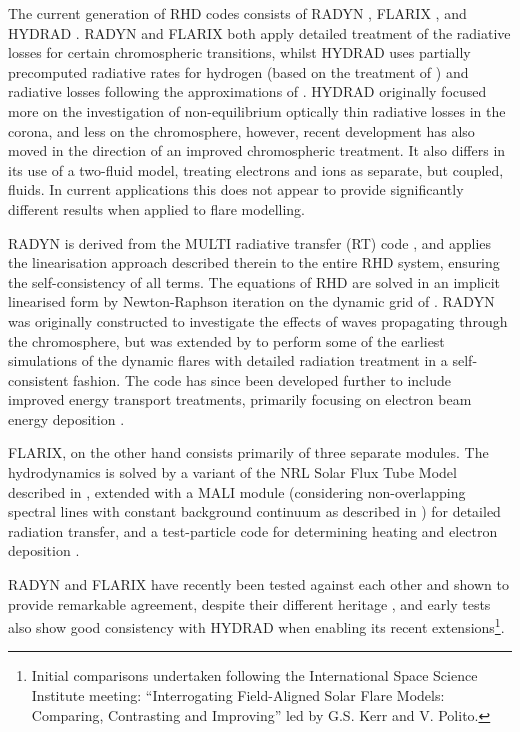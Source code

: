 The current generation of RHD codes consists of RADYN \citep{Carlsson1992a,Carlsson1995,Carlsson1999, Allred2015}, FLARIX \citep{Varady2010,Heinzel2015}, and HYDRAD \citep{Bradshaw2003, Bradshaw2013}. RADYN and FLARIX both apply detailed treatment of the radiative losses for certain chromospheric transitions, whilst HYDRAD uses partially precomputed radiative rates for hydrogen (based on the treatment of \citet{Sollum1999}) and radiative losses following the approximations of \citet{Carlsson2012}.
HYDRAD originally focused more on the investigation of non-equilibrium optically thin radiative losses in the corona, and less on the chromosphere, however, recent development has also moved in the direction of an improved chromospheric treatment.
It also differs in its use of a two-fluid model, treating electrons and ions as separate, but coupled, fluids.
In current applications this does not appear to provide significantly different results when applied to flare modelling.

RADYN is derived from the MULTI radiative transfer (RT) code \citep{Scharmer1985, Carlsson1986, Carlsson1992}, and applies the linearisation approach described therein to the entire RHD system, ensuring the self-consistency of all terms. The equations of RHD are solved in an implicit linearised form by Newton-Raphson iteration on the dynamic grid of \citet{Dorfi1987}.
RADYN was originally constructed to investigate the effects of waves propagating through the chromosphere, but was extended by \citet{Abbett1999} to perform some of the earliest simulations of the dynamic flares with detailed radiation treatment in a self-consistent fashion. The code has since been developed further to include improved energy transport treatments, primarily focusing on electron beam energy deposition \citep{Allred2005, Allred2015}.


FLARIX, on the other hand consists primarily of three separate modules. The hydrodynamics is solved by a variant of the NRL Solar Flux Tube Model described in \citet{Mariska1982,Mariska1989}, extended with a MALI module (considering non-overlapping spectral lines with constant background continuum as described in \citet{Rybicki1991}) for detailed radiation transfer, and a test-particle code for determining heating and electron deposition \citep{Varady2010, Heinzel2015}.

RADYN and FLARIX have recently been tested against each other and shown to provide remarkable agreement, despite their different heritage \citep{Kasparova2019}, and early tests also show good consistency with HYDRAD when enabling its recent extensions\footnote{Initial comparisons undertaken following the International Space Science Institute meeting: ``Interrogating Field-Aligned Solar Flare Models: Comparing, Contrasting and Improving'' led by G.S. Kerr and V. Polito.}.

